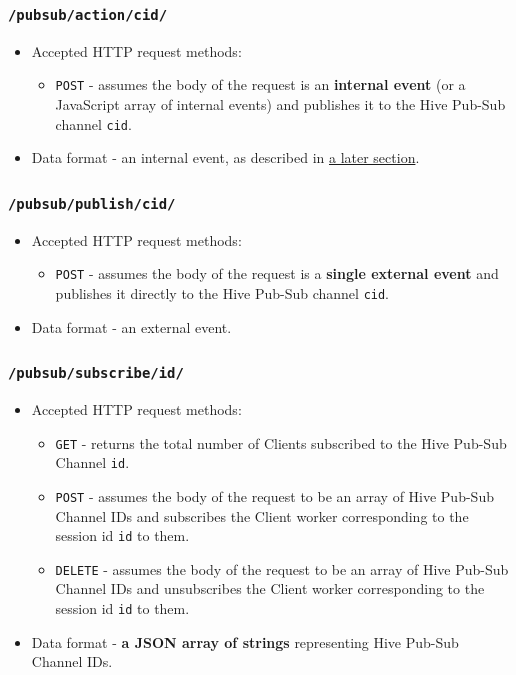 \documentclass[a4paper]{article}
\begin{document}
\subsubsection{\texttt{/pubsub/action/cid/}}
\label{sec-6-1-6}
\label{ref-api_pubsub}



\begin{itemize}
\item Accepted HTTP request methods:
\begin{itemize}
\item \texttt{POST} - assumes the body of the request is an \textbf{internal event} (or a JavaScript array of internal events) and publishes it to the Hive Pub-Sub channel \texttt{cid}.
\end{itemize}
\item Data format - an internal event, as described in \hyperref[sec-8-3]{a later section}.
\end{itemize}
\subsubsection{\texttt{/pubsub/publish/cid/}}
\label{sec-6-1-7}



\begin{itemize}
\item Accepted HTTP request methods:
\begin{itemize}
\item \texttt{POST} - assumes the body of the request is a \textbf{single external event} and publishes it directly to the Hive Pub-Sub channel \texttt{cid}.
\end{itemize}
\item Data format - an external event.
\end{itemize}
\subsubsection{\texttt{/pubsub/subscribe/id/}}
\label{sec-6-1-8}



\begin{itemize}
\item Accepted HTTP request methods:
\begin{itemize}
\item \texttt{GET} - returns the total number of Clients subscribed to the Hive Pub-Sub Channel \texttt{id}.
\item \texttt{POST} - assumes the body of the request to be an array of Hive Pub-Sub Channel IDs and subscribes the Client worker corresponding to the session id \texttt{id} to them.
\item \texttt{DELETE} - assumes the body of the request to be an array of Hive Pub-Sub Channel IDs and unsubscribes the Client worker corresponding to the session id \texttt{id} to them.
\end{itemize}
\item Data format - \textbf{a JSON array of strings} representing Hive Pub-Sub Channel IDs.
\end{itemize}
\end{document}
